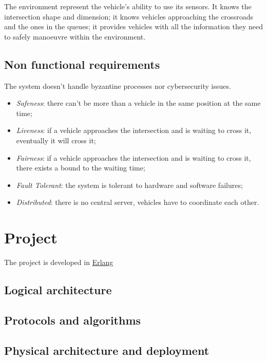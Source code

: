 \documentclass{memoir}
\begin{document}
The environment represent the vehicle's ability to use its sensors. It knows the intersection shape and dimension; it knows vehicles approaching the crossroads and the ones in the queues; it provides vehicles with all the information they need to safely manoeuvre within the environment.

\section{Non functional requirements}
The system doesn't handle byzantine processes nor cybersecurity issues.

\begin{itemize}
	\item \emph{Safeness}: there can't be more than a vehicle in the same position at the same time;
	\item \emph{Liveness}: if a vehicle approaches the intersection and is waiting to cross it, eventually it will cross it;
	\item \emph{Fairness}: if a vehicle approaches the intersection and is waiting to cross it, there exists a bound to the waiting time;
	\item \emph{Fault Tolerant}: the system is tolerant to hardware and software failures;
	\item \emph{Distributed}: there is no central server, vehicles have to coordinate each other.
\end{itemize}



\chapter{Project}\label{ch:project}

The project is developed in \href{https://www.erlang.org/}{Erlang}

\section{Logical architecture}

\section{Protocols and algorithms}

\section{Physical architecture and deployment}
\end{document}
